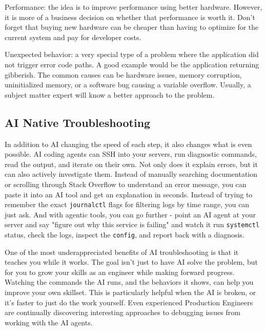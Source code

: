 \documentclass[11pt]{article}
\begin{document}
\begin{enumerate}
\noindent Performance: the idea is to improve performance using better hardware. However, it is more of a business decision on whether that performance is worth it. Don't forget that buying new hardware can be cheaper than having to optimize for the current system and pay for developer costs.

\noindent Unexpected behavior: a very special type of a problem where the application did not trigger error code paths. A good example would be the application returning gibberish. The common causes can be hardware issues, memory corruption, uninitialized memory, or a software bug causing a variable overflow. Usually, a subject matter expert will know a better approach to the problem.

\subsection*{AI Native Troubleshooting}
\noindent In addition to AI changing the speed of each step, it also changes what is even possible. AI coding agents can SSH into your servers, run diagnostic commands, read the output, and iterate on their own. Not only does it explain errors, but it can also actively investigate them. Instead of manually searching documentation or scrolling through Stack Overflow to understand an error message, you can paste it into an AI tool and get an explanation in seconds. Instead of trying to remember the exact \texttt{journalctl} flags for filtering logs by time range, you can just ask. And with agentic tools, you can go further - point an AI agent at your server and say "figure out why this service is failing" and watch it run \texttt{systemctl} status, check the logs, inspect the \texttt{config}, and report back with a diagnosis.

\noindent One of the most underappreciated benefits of AI troubleshooting is that it teaches you while it works. The goal isn’t just to have AI solve the problem, but for you to grow your skills as an engineer while making forward progress. Watching the commands the AI runs, and the behaviors it shows, can help you improve your own skillset. This is particularly helpful when the AI is broken, or it’s faster to just do the work yourself. Even experienced Production Engineers are continually discovering interesting approaches to debugging issues from working with the AI agents.


\end{enumerate}
\end{document}
